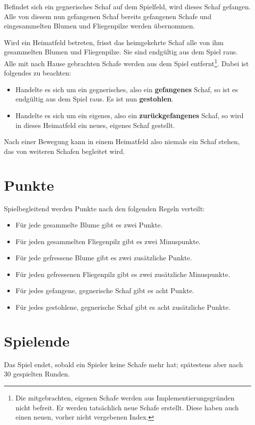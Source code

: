 \documentclass[11pt,pointlessnumbers,DIV10,BCOR10mm,tocleft]{scrreprt}
\begin{document}
Befindet sich ein gegnerisches Schaf auf dem Spielfeld, wird dieses Schaf gefangen. Alle von diesem nun gefangenen Schaf bereits gefangenen Schafe und eingesammelten Blumen und Fliegenpilze werden übernommen.

Wird ein Heimatfeld betreten, frisst das heimgekehrte Schaf alle von ihm gesammelten Blumen und Fliegenpilze. Sie sind endgültig aus dem Spiel raus. Alle mit nach Hause gebrachten Schafe werden aus dem Spiel entfernt\footnote{Die mitgebrachten, eigenen Schafe werden aus Implementierungsgründen nicht befreit. Er werden tatsächlich neue Schafe erstellt. Diese haben auch einen neuen, vorher nicht vergebenen Index.}. Dabei ist folgendes zu beachten:

\begin{itemize}
\item Handelte es sich um ein gegnerisches, also ein \textbf{gefangenes} Schaf, so ist es endgültig aus dem Spiel raus. Es ist nun \textbf{gestohlen}.
\item Handelte es sich um ein eigenes, also ein \textbf{zurückgefangenes} Schaf, so  wird in dieses Heimatfeld ein neues, eigenes Schaf gestellt.
\end{itemize} 

Nach einer Bewegung kann in einem Heimatfeld also niemals ein Schaf stehen, das von weiteren Schafen begleitet wird.

\section{Punkte}
Spielbegleitend werden Punkte nach den folgenden Regeln verteilt:

\begin{itemize}
\item Für jede gesammelte Blume gibt es zwei Punkte.
\item Für jeden gesammelten Fliegenpilz gibt es zwei Minuspunkte.
\item Für jede gefressene Blume gibt es zwei zusätzliche Punkte.
\item Für jeden gefressenen Fliegenpilz gibt es zwei zusätzliche Minuspunkte.
\item Für jedes gefangene, gegnerische Schaf gibt es acht Punkte.
\item Für jedes gestohlene, gegnerische Schaf gibt es acht zusätzliche Punkte.
\end{itemize}

\section{Spielende}
Das Spiel endet, sobald ein Spieler keine Schafe mehr hat; spätestens aber nach 30 gespielten Runden.
\end{document}
